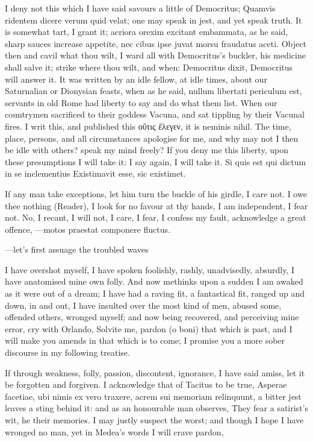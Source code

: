 {I deny not this which I have said savours a little of Democritus; 
Quamvis ridentem dicere verum quid velat; one may speak in jest, and
yet speak truth. It is somewhat tart, I grant it; acriora orexim
excitant embammata, as he said, sharp sauces increase appetite,
nec cibus ipse juvat morsu fraudatus aceti. Object then and cavil
what thou wilt, I ward all with Democritus's buckler, his medicine
shall salve it; strike where thou wilt, and when: Democritus dixit,
Democritus will answer it. It was written by an idle fellow, at idle
times, about our Saturnalian or Dionysian feasts, when as he said,
nullum libertati periculum est, servants in old Rome had liberty to say
and do what them list. When our countrymen sacrificed to their goddess
Vacuna, and sat tippling by their Vacunal fires. I writ this, and
published this οὕτις ἕλεγεν, it is neminis nihil. The time, place,
persons, and all circumstances apologise for me, and why may not I then
be idle with others? speak my mind freely? If you deny me this liberty,
upon these presumptions I will take it: I say again, I will take it.
Si quis est qui dictum in se inclementius
Existimavit esse, sic existimet.

If any man take exceptions, let him turn the buckle of his girdle, I
care not. I owe thee nothing (Reader), I look for no favour at thy
hands, I am independent, I fear not.
No, I recant, I will not, I care, I fear, I confess my fault,
acknowledge a great offence,
---motos praestat componere fluctus.

---let's first assuage the troubled waves

I have overshot myself, I have spoken foolishly, rashly, unadvisedly,
absurdly, I have anatomised mine own folly. And now methinks upon a
sudden I am awaked as it were out of a dream; I have had a raving fit,
a fantastical fit, ranged up and down, in and out, I have insulted over
the most kind of men, abused some, offended others, wronged myself; and
now being recovered, and perceiving mine error, cry with Orlando,
Solvite me, pardon (o boni) that which is past, and I will make you
amends in that which is to come; I promise you a more sober discourse
in my following treatise.

If through weakness, folly, passion, discontent, ignorance, I have
said amiss, let it be forgotten and forgiven. I acknowledge that of
 Tacitus to be true, Asperae facetiae, ubi nimis ex vero traxere,
acrem sui memoriam relinquunt, a bitter jest leaves a sting behind it:
and as an honourable man observes, They fear a satirist's wit, he
their memories. I may justly suspect the worst; and though I hope I
have wronged no man, yet in Medea's words I will crave pardon,

}
